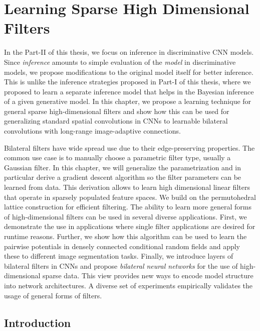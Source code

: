 \chapter{Learning Sparse High Dimensional Filters}
\label{chap:bnn}

\newcommand{\bv}{\mathbf{x}}
\newcommand{\bw}{\mathbf{w}}

In the Part-II of this thesis, we focus on inference in discriminative CNN models. Since \emph{inference}
amounts to simple evaluation of the \emph{model} in discriminative models,
we propose modifications to the original model itself for better inference.
This is unlike the inference strategies proposed in Part-I of this
thesis, where we proposed to learn a separate inference model that helps in the Bayesian inference
of a given generative model. In this chapter, we propose a learning technique for general sparse
high-dimensional filters and show how this can be used for generalizing standard spatial
convolutions in CNNs to learnable bilateral convolutions with long-range image-adaptive connections.

Bilateral filters have wide spread use due to their edge-preserving properties. The common
use case is to manually choose a parametric filter type, usually a Gaussian filter. In this chapter,
we will generalize the parametrization and in particular derive a gradient descent algorithm
so the filter parameters can be learned from data. This derivation allows to learn
high dimensional linear filters that operate in sparsely populated feature spaces. We build on
the permutohedral lattice construction for efficient filtering.
%
The ability to learn more general forms of high-dimensional filters can be used in
several diverse applications.
First, we demonstrate the use in applications where single filter applications are desired for runtime reasons.
Further, we show how this algorithm can be used to learn the pairwise potentials in
densely connected conditional random fields and apply these to different image segmentation tasks.
Finally, we introduce layers of bilateral filters in CNNs and propose
\emph{bilateral neural networks} for the use of high-dimensional
sparse data. This view provides new ways to encode model structure into network architectures. A diverse
set of experiments empirically validates the usage of general forms of filters.

\section{Introduction}
\label{sec:intro-bnn}

